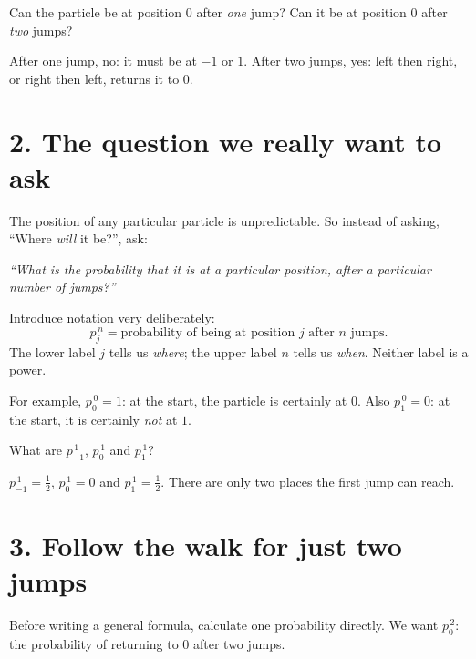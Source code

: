 \documentclass[11pt,a4paper]{article}
\newcommand{\ans}[1]{\par\vspace{4pt}{\small\color{blue}\textbf{Answer.}}\enspace #1}
\begin{document}
\begin{think}
Can the particle be at position $0$ after \emph{one} jump? Can it be at position $0$ after \emph{two} jumps?
\ans{After one jump, no: it must be at $-1$ or $1$. After two jumps, yes: left then right, or right then left, returns it to $0$.}
\end{think}

\section{2. The question we really want to ask}
The position of any particular particle is unpredictable. So instead of asking, ``Where \emph{will} it be?'', ask:
\begin{center}
\emph{``What is the probability that it is at a particular position, after a particular number of jumps?''}
\end{center}
Introduce notation very deliberately:
\[
\boxed{p_j^{\,n}=\text{probability of being at position $j$ after $n$ jumps}.}
\]
The lower label $j$ tells us \emph{where}; the upper label $n$ tells us \emph{when}. Neither label is a power.

For example, $p_0^{\,0}=1$: at the start, the particle is certainly at $0$. Also $p_1^{\,0}=0$: at the start, it is certainly \emph{not} at $1$.

\begin{think}
What are $p_{-1}^{\,1}$, $p_0^{\,1}$ and $p_1^{\,1}$?
\ans{$p_{-1}^{\,1}=\tfrac12$, $p_0^{\,1}=0$ and $p_1^{\,1}=\tfrac12$. There are only two places the first jump can reach.}
\end{think}

\newpage
\section{3. Follow the walk for just two jumps}
Before writing a general formula, calculate one probability directly. We want $p_0^{\,2}$: the probability of returning to $0$ after two jumps.
\end{document}
